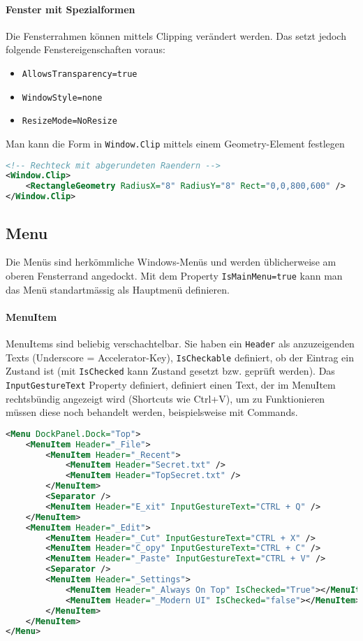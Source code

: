 \paragraph{Fenster mit Spezialformen} Die Fensterrahmen können mittels Clipping verändert werden. Das setzt jedoch folgende Fenstereigenschaften voraus:
\begin{itemize}
\item \verb+AllowsTransparency=true+
\item \verb+WindowStyle=none+
\item \verb+ResizeMode=NoResize+
\end{itemize}
Man kann die Form in \verb+Window.Clip+ mittels einem Geometry-Element festlegen
\begin{lstlisting}[language=xml]
<!-- Rechteck mit abgerundeten Raendern -->
<Window.Clip>
    <RectangleGeometry RadiusX="8" RadiusY="8" Rect="0,0,800,600" />
</Window.Clip>
\end{lstlisting}
\subsection{Menu}
Die Menüs sind herkömmliche Windows-Menüs und werden üblicherweise am oberen Fensterrand angedockt. Mit dem Property \verb+IsMainMenu=true+ kann man das Menü standartmässig als Hauptmenü definieren.
\paragraph{MenuItem} MenuItems sind beliebig verschachtelbar. Sie haben ein \verb+Header+ als anzuzeigenden Texts (Underscore = Accelerator-Key), \verb+IsCheckable+ definiert, ob der Eintrag ein Zustand ist (mit \verb+IsChecked+ kann Zustand gesetzt bzw. geprüft werden). Das \verb+InputGestureText+ Property definiert, definiert einen Text, der im MenuItem rechtsbündig angezeigt wird (Shortcuts wie Ctrl+V), um zu Funktionieren müssen diese noch behandelt werden, beispielsweise mit Commands.
\begin{lstlisting}[language=xml]
<Menu DockPanel.Dock="Top">
    <MenuItem Header="_File">
        <MenuItem Header="_Recent">
            <MenuItem Header="Secret.txt" />
            <MenuItem Header="TopSecret.txt" />
        </MenuItem>
        <Separator />
        <MenuItem Header="E_xit" InputGestureText="CTRL + Q" />
    </MenuItem>
    <MenuItem Header="_Edit">
        <MenuItem Header="_Cut" InputGestureText="CTRL + X" />
        <MenuItem Header="C_opy" InputGestureText="CTRL + C" />
        <MenuItem Header="_Paste" InputGestureText="CTRL + V" />
        <Separator />
        <MenuItem Header="_Settings">
            <MenuItem Header="_Always On Top" IsChecked="True"></MenuItem>
            <MenuItem Header="_Modern UI" IsChecked="false"></MenuItem>
        </MenuItem>
    </MenuItem>
</Menu>
\end{lstlisting}
